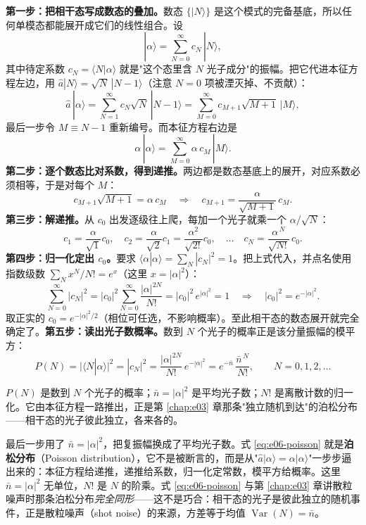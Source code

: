 \textbf{第一步：把相干态写成数态的叠加。}数态 \(\{|N\rangle\}\) 是这个模式的完备基底，所以任何单模态都能展开成它们的线性组合。设
\[
  |\alpha\rangle=\sum_{N=0}^{\infty}c_N\,|N\rangle,
\]
其中待定系数 \(c_N=\langle N|\alpha\rangle\) 就是"这个态里含 \(N\) 光子成分"的振幅。把它代进本征方程左边，用 \(\hat a|N\rangle=\sqrt{N}\,|N-1\rangle\)（注意 \(N=0\) 项被湮灭掉、不贡献）：
\[
  \hat a\,|\alpha\rangle
  =\sum_{N=1}^{\infty}c_N\sqrt{N}\,|N-1\rangle
  =\sum_{M=0}^{\infty}c_{M+1}\sqrt{M+1}\,|M\rangle,
\]
最后一步令 \(M\equiv N-1\) 重新编号。而本征方程右边是
\[
  \alpha\,|\alpha\rangle=\sum_{M=0}^{\infty}\alpha\,c_M\,|M\rangle.
\]
\textbf{第二步：逐个数态比对系数，得到递推。}两边都是数态基底上的展开，对应系数必须相等，于是对每个 \(M\)：
\[
  c_{M+1}\sqrt{M+1}=\alpha\,c_M
  \quad\Longrightarrow\quad
  c_{M+1}=\frac{\alpha}{\sqrt{M+1}}\,c_M .
\]
\textbf{第三步：解递推。}从 \(c_0\) 出发逐级往上爬，每加一个光子就乘一个 \(\alpha/\sqrt{N}\)：
\[
  c_1=\frac{\alpha}{\sqrt1}c_0,\quad
  c_2=\frac{\alpha}{\sqrt2}c_1=\frac{\alpha^2}{\sqrt{2!}}c_0,\quad\dots\quad
  c_N=\frac{\alpha^{\,N}}{\sqrt{N!}}\,c_0 .
\]
\textbf{第四步：归一化定出 \(c_0\)。}要求 \(\langle\alpha|\alpha\rangle=\sum_N|c_N|^2=1\)。把上式代入，并点名使用指数级数 \(\sum_{N}x^N/N!=e^{x}\)（这里 \(x=|\alpha|^2\)）：
\[
  \sum_{N=0}^{\infty}|c_N|^2
  =|c_0|^2\sum_{N=0}^{\infty}\frac{|\alpha|^{2N}}{N!}
  =|c_0|^2\,e^{|\alpha|^2}=1
  \quad\Longrightarrow\quad
  |c_0|^2=e^{-|\alpha|^2}.
\]
取正实的 \(c_0=e^{-|\alpha|^2/2}\)（相位可任选，不影响概率）。至此相干态的数态展开就完全确定了。\textbf{第五步：读出光子数概率。}数到 \(N\) 个光子的概率正是该分量振幅的模平方：
\begin{equation}
  P(N)=\big|\langle N|\alpha\rangle\big|^2=|c_N|^2
  =\frac{|\alpha|^{2N}}{N!}\,e^{-|\alpha|^2}
  =e^{-\bar n}\,\frac{\bar n^{\,N}}{N!},
  \qquad N=0,1,2,\dots
  \label{eq:e06-poisson}
\end{equation}
\begin{formulaexplain}
\(P(N)\) 是数到 \(N\) 个光子的概率；\(\bar n=|\alpha|^2\) 是平均光子数；\(N!\) 是离散计数的归一化。它由本征方程一路推出，正是第 \ref{chap:e03} 章那条"独立随机到达"的泊松分布——相干态的光子彼此独立，各来各的。
\end{formulaexplain}

最后一步用了 \(\bar n=|\alpha|^2\)，把复振幅换成了平均光子数。式 \eqref{eq:e06-poisson} 就是\textbf{泊松分布}（Poisson distribution），它不是被断言的，而是从"\(\hat a|\alpha\rangle=\alpha|\alpha\rangle\)"一步步逼出来的：本征方程给递推，递推给系数，归一化定常数，模平方给概率。这里 \(\bar n=|\alpha|^2\) 无单位，\(N!\) 是 \(N\) 的阶乘。式 \eqref{eq:e06-poisson} 与第 \ref{chap:e03} 章讲散粒噪声时那条泊松分布\emph{完全同形}——这不是巧合：相干态的光子是彼此独立的随机事件，正是散粒噪声（shot noise）的来源，方差等于均值 \(\operatorname{Var}(N)=\bar n\)。

